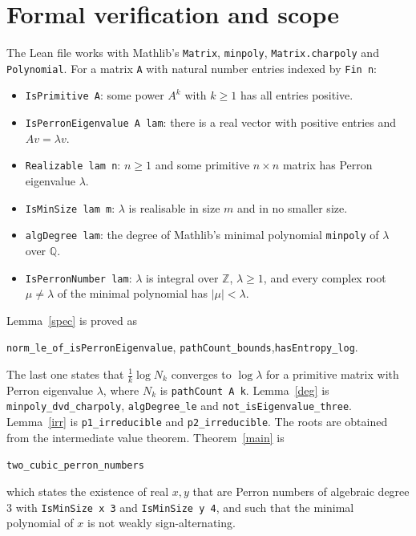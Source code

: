\documentclass[11pt]{article}
\theoremstyle{remark}
\begin{document}
\section*{Formal verification and scope}
The Lean file works with Mathlib's \texttt{Matrix}, \texttt{minpoly},
\texttt{Matrix.charpoly} and \texttt{Polynomial}. For a matrix
\texttt{A} with natural number entries indexed by \texttt{Fin n}:
\begin{itemize}
\item \texttt{IsPrimitive A}: some power $A^k$ with $k\ge1$ has all
entries positive.
\item \texttt{IsPerronEigenvalue A lam}: there is a real vector with
positive entries and $Av=\lambda v$.
\item \texttt{Realizable lam n}: $n\ge1$ and some primitive $n\times n$
matrix has Perron eigenvalue $\lambda$.
\item \texttt{IsMinSize lam m}: $\lambda$ is realisable in size $m$ and
in no smaller size.
\item \texttt{algDegree lam}: the degree of Mathlib's minimal polynomial
\texttt{minpoly} of $\lambda$ over $\mathbb{Q}$.
\item \texttt{IsPerronNumber lam}: $\lambda$ is integral over
$\mathbb{Z}$, $\lambda\ge1$, and every complex root $\mu\ne\lambda$ of
the minimal polynomial has $|\mu|<\lambda$.
\end{itemize}
Lemma~\ref{spec} is proved as
\begin{center}\small
\texttt{norm\_le\_of\_isPerronEigenvalue},\quad
\texttt{pathCount\_bounds},\quad \texttt{hasEntropy\_log}.
\end{center}
The last one states that $\frac1k\log N_k$ converges to $\log\lambda$
for a primitive matrix with Perron eigenvalue $\lambda$, where $N_k$ is
\texttt{pathCount A k}. Lemma~\ref{deg} is
\texttt{minpoly\_dvd\_charpoly}, \texttt{algDegree\_le} and
\texttt{not\_isEigenvalue\_three}. Lemma~\ref{irr} is
\texttt{p1\_irreducible} and \texttt{p2\_irreducible}. The roots are
obtained from the intermediate value theorem. Theorem~\ref{main} is
\begin{center}\small\texttt{two\_cubic\_perron\_numbers}\end{center}
which states the existence of real $x,y$ that are Perron numbers of
algebraic degree $3$ with \texttt{IsMinSize x 3} and
\texttt{IsMinSize y 4}, and such that the minimal polynomial of $x$ is
not weakly sign-alternating.
\end{document}
